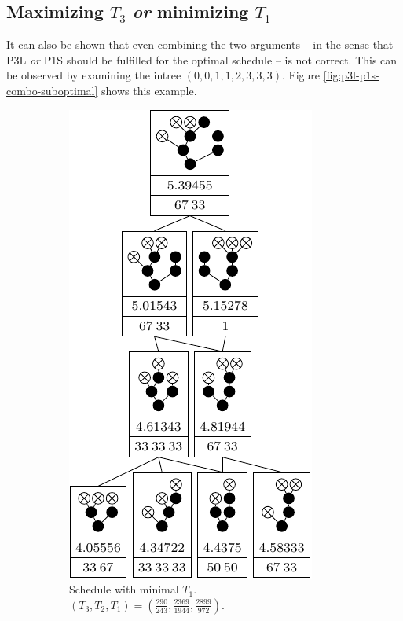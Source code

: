 \subsection{Maximizing $T_3$ \emph{or} minimizing $T_1$}
\label{sec:p3-suboptimality-maximizing-t3-and-minimizing-t1}

It can also be shown that even combining the two arguments -- in the sense that P3L \emph{or} P1S should be fulfilled for the optimal schedule -- is not correct. This can be observed by examining the intree $(0, 0, 1, 1, 2, 3, 3, 3)$. Figure \ref{fig:p3l-p1s-combo-suboptimal} shows this example.

\begin{figure}[ht]
  \centering
  \begin{subfigure}{.3\linewidth}
    \centering
    \includegraphics{p3/max_p3_min_p1/00112333t1min.pdf}
    \caption{Schedule with minimal $T_1$. $(T_3,T_2,T_1)=(\frac{290}{243},\frac{2369}{1944},\frac{2899}{972})$.}
  \end{subfigure}
  \quad
  \begin{subfigure}{.3\linewidth}
    \centering

\end{subfigure}
\end{figure}
